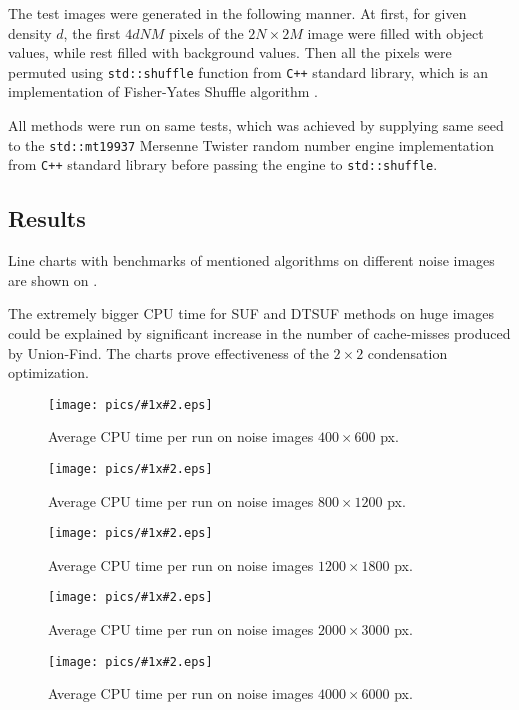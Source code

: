 \documentclass[hidelinks]{llncs}
\newcommand{\CXX}{\texttt{C++} \xspace}
\begin{document}
The test images were generated in the following manner. At first, for given
density $d$, the first $4dNM$ pixels of the $2N \times 2M$ image were filled
with object values, while rest filled with background values. Then all the
pixels were permuted using \texttt{std::shuffle} function from \CXX standard
library, which is an implementation of Fisher-Yates Shuffle
algorithm%
.

All methods were run on same tests, which was achieved by supplying same seed
to the \texttt{std::mt19937} Mersenne Twister\cite{mt19937} random number
engine implementation from \CXX standard library before passing the engine to
\texttt{std::shuffle}.

\subsection{Results}

Line charts with benchmarks of mentioned algorithms on different noise images
are shown on
.

The extremely bigger CPU time for SUF and DTSUF methods on huge images could be
explained by significant increase in the number of cache-misses produced by
Union-Find. The charts prove effectiveness of the $2 \times 2$ condensation
optimization.  

\newcommand{\inputtable}[2]{
  \begin{figure}
    \centering
    \texttt{[image: pics/\#1x\#2.eps]}
    \caption{Average CPU time per run on noise images $#1 \times #2$ px.}
    \label{fig:noise#1x#2}
  \end{figure}
}

\inputtable{400}{600}
\inputtable{800}{1200}
\inputtable{1200}{1800}
\inputtable{2000}{3000}
\inputtable{4000}{6000}

\end{document}
